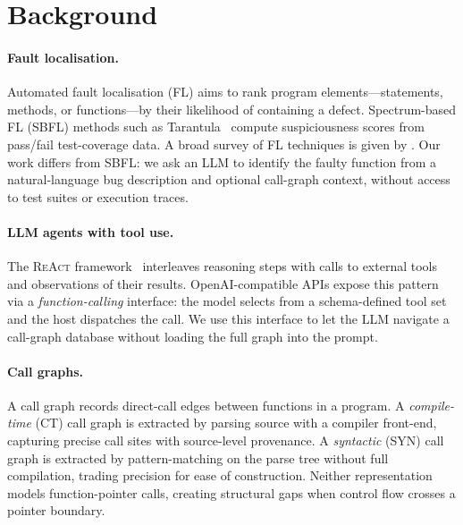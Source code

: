 \section{Background}
\label{sec:background}

\paragraph{Fault localisation.}
Automated fault localisation (FL) aims to rank program elements---statements,
methods, or functions---by their likelihood of containing a defect.
Spectrum-based FL (SBFL) methods such as Tarantula~\cite{jones05tarantula}
compute suspiciousness scores from pass/fail test-coverage data.
A broad survey of FL techniques is given by \citet{wong16survey}.
Our work differs from SBFL: we ask an LLM to identify the faulty function
from a natural-language bug description and optional call-graph context,
without access to test suites or execution traces.

\paragraph{LLM agents with tool use.}
The \textsc{ReAct} framework~\cite{yao23react} interleaves reasoning steps
with calls to external tools and observations of their results.
OpenAI-compatible APIs expose this pattern via a \emph{function-calling}
interface: the model selects from a schema-defined tool set and the host
dispatches the call.
We use this interface to let the LLM navigate a call-graph database without
loading the full graph into the prompt.

\paragraph{Call graphs.}
A call graph records direct-call edges between functions in a program.
A \emph{compile-time} (CT) call graph is extracted by parsing source with a
compiler front-end, capturing precise call sites with source-level provenance.
A \emph{syntactic} (SYN) call graph is extracted by pattern-matching on the
parse tree without full compilation, trading precision for ease of construction.
Neither representation models function-pointer calls, creating structural gaps
when control flow crosses a pointer boundary.
